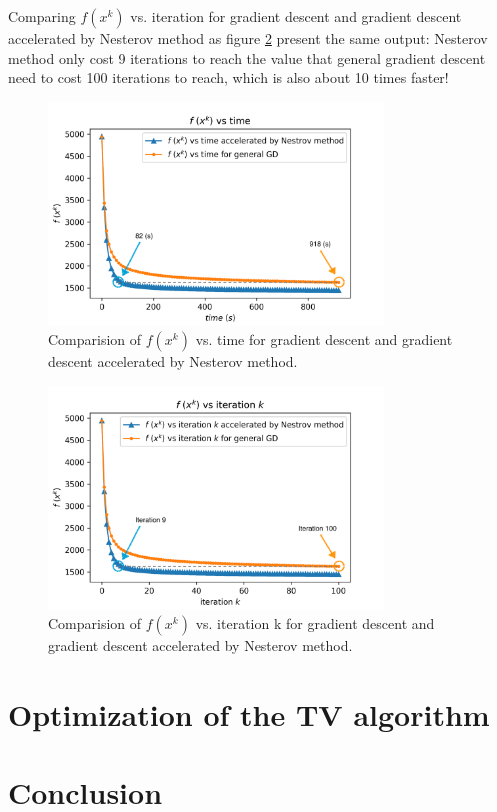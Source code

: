 \documentclass{article}
\begin{document}
Comparing $f(x^{k})$ vs. iteration for gradient descent and gradient descent accelerated by Nesterov method as figure \ref{img15} present the same output: Nesterov method only cost 9 iterations to reach the value that general gradient descent need to cost 100 iterations to reach, which is also about 10 times faster! 

\begin{figure}[h]
  \includegraphics[width=3.5in]{pic14.png}
  \centering
  \caption{Comparision of $f(x^{k})$ vs. time for gradient descent and gradient descent accelerated by Nesterov method.}
  \label{img14}
\end{figure}

\begin{figure}[h]
  \includegraphics[width=3.5in]{pic15.png}
  \centering
  \caption{Comparision of $f(x^{k})$ vs. iteration k for gradient descent and gradient descent accelerated by Nesterov method.}
  \label{img15}
\end{figure}


\section{Optimization of the TV algorithm}

\section{Conclusion}




\end{document}
